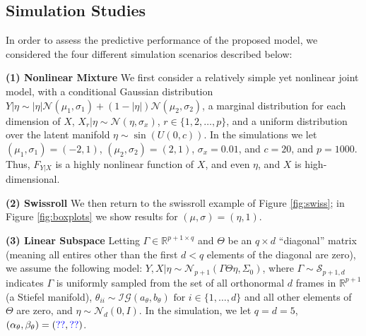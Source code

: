 \documentclass{article} %
\newcommand{\Real}{\mathbb{R}}
\providecommand{\mc}[1]{\mathcal{#1}}
\newcommand{\dd}[1]{{\color{blue}{\it #1}}}
\begin{document}
\subsection{Simulation Studies}\label{sec:sim}

In order to assess the predictive performance of the proposed model, we considered the four different simulation scenarios described below: 

\textbf{(1) Nonlinear Mixture}
%
We first consider a relatively simple yet nonlinear joint model, with a conditional Gaussian distribution
	\mbox{$Y|\eta \sim  |\eta| \mc{N}(\mu_1,\sigma_1) + (1-|\eta|) \mc{N}(\mu_2,\sigma_2)$}, 
	a marginal distribution for each dimension of $X$, $X_r|\eta  \sim \mc{N}(\eta, \sigma_x)$, 
	$r \in \{1, 2, \ldots, p\}$, 
	and a uniform distribution over the latent manifold $\eta  \sim \sin(U(0,c))$. %
In the simulations we let $(\mu_1,\sigma_1)=(-2,1)$, $(\mu_2,\sigma_2)=(2,1)$, $\sigma_x=0.01$, and $c=20$, and $p=1000$. Thus, $F_{Y|X}$ is a highly nonlinear function of $X$, and even $\eta$, and $X$ is high-dimensional.  

\textbf{(2) Swissroll} 
% 
We then return to the swissroll example of Figure \ref{fig:swiss}; in Figure \ref{fig:boxplots} we show results for $(\mu,\sigma)=(\eta,1)$. %

\textbf{(3) Linear Subspace} Letting $\Gamma \in \Real^{p+1 \times q}$ and $\Theta$ be an ${q \times d}$ ``diagonal'' matrix (meaning all entires other than the first $d < q$ elements of the diagonal are zero), we assume the following model:
	$Y,X |\eta \sim \mc{N}_{p+1}(\Gamma \Theta \eta ,\Sigma_0)$,
	where 	$\Gamma \sim \mc{S}_{p+1,d}$ indicates $\Gamma$ is uniformly sampled from the set of all orthonormal $d$ frames in $\Real^{p+1}$ (a Stiefel manifold), 
	$\theta_{ii} \sim \mc{IG}(a_\theta,b_\theta) \text{ for } i \in \{1, \ldots, d\}$ and all other elements of $\Theta$ are zero, and $\eta  \sim \mc{N}_d(0, I)$.  In the simulation, we let $q=d=5$,   $(\alpha_\theta,\beta_\theta)=(\dd{??},\dd{??})$. %
\end{document}
